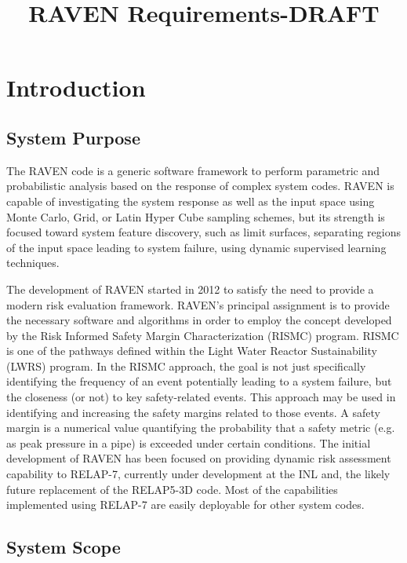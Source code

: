 \documentclass{article}
\title{RAVEN Requirements-DRAFT}
\begin{document}
\maketitle

\section{Introduction}

\subsection{System Purpose}

The RAVEN code is a generic software framework to perform parametric
and probabilistic analysis based on the response of complex system
codes. RAVEN is capable of investigating the system response as well
as the input space using Monte Carlo, Grid, or Latin Hyper Cube
sampling schemes, but its strength is focused toward system feature
discovery, such as limit surfaces, separating regions of the input
space leading to system failure, using dynamic supervised learning
techniques.

The development of RAVEN started in 2012 to satisfy the need to
provide a modern risk evaluation framework. RAVEN's principal
assignment is to provide the necessary software and algorithms in
order to employ the concept developed by the Risk Informed Safety
Margin Characterization (RISMC) program. RISMC is one of the pathways
defined within the Light Water Reactor Sustainability (LWRS)
program. In the RISMC approach, the goal is not just specifically
identifying the frequency of an event potentially leading to a system
failure, but the closeness (or not) to key safety-related events. This
approach may be used in identifying and increasing the safety margins
related to those events. A safety margin is a numerical value
quantifying the probability that a safety metric (e.g. as peak
pressure in a pipe) is exceeded under certain conditions. The initial
development of RAVEN has been focused on providing dynamic risk
assessment capability to RELAP-7, currently under development at the
INL and, the likely future replacement of the RELAP5-3D code. Most of
the capabilities implemented using RELAP-7 are easily deployable for
other system codes.

\subsection{System Scope}
\end{document}
